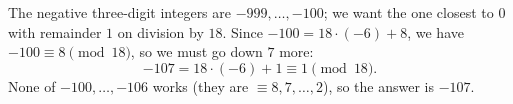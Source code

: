 The negative three-digit integers are $-999,\dots,-100$; we want the one closest to $0$ with remainder $1$ on division by $18$. Since $-100=18\cdot(-6)+8$, we have $-100\equiv8\pmod{18}$, so we must go down $7$ more:
\[
-107=18\cdot(-6)+1\equiv1\pmod{18}.
\]
None of $-100,\dots,-106$ works (they are $\equiv8,7,\dots,2$), so the answer is $\boxed{-107}$.
